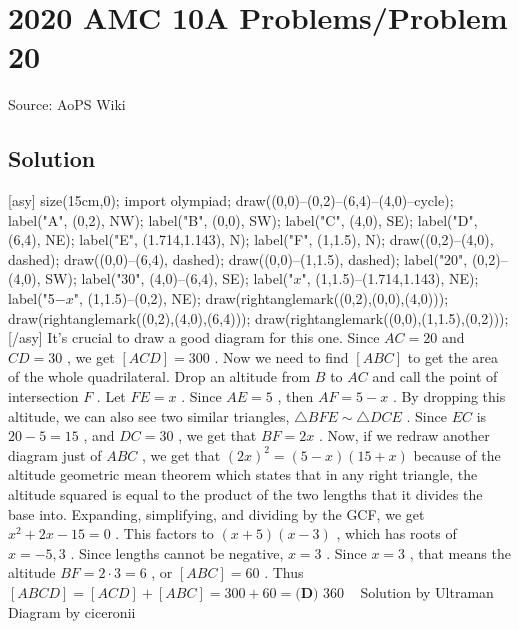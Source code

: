 \documentclass[12pt]{article}
\begin{document}
\section*{{2020 AMC 10A Problems/Problem 20}}
Source: AoPS Wiki

\subsection*{Solution}
[asy] size(15cm,0); import olympiad; draw((0,0)--(0,2)--(6,4)--(4,0)--cycle); label("A", (0,2), NW); label("B", (0,0), SW); label("C", (4,0), SE); label("D", (6,4), NE); label("E", (1.714,1.143), N); label("F", (1,1.5), N); draw((0,2)--(4,0), dashed); draw((0,0)--(6,4), dashed); draw((0,0)--(1,1.5), dashed); label("20", (0,2)--(4,0), SW); label("30", (4,0)--(6,4), SE); label("$x$", (1,1.5)--(1.714,1.143), NE); label("5$-$$x$", (1,1.5)--(0,2), NE); draw(rightanglemark((0,2),(0,0),(4,0))); draw(rightanglemark((0,2),(4,0),(6,4))); draw(rightanglemark((0,0),(1,1.5),(0,2))); [/asy] It's crucial to draw a good diagram for this one. Since $AC=20$ and $CD=30$ , we get $[ACD]=300$ . Now we need to find $[ABC]$ to get the area of the whole quadrilateral. Drop an altitude from $B$ to $AC$ and call the point of intersection $F$ . Let $FE=x$ . Since $AE=5$ , then $AF=5-x$ . By dropping this altitude, we can also see two similar triangles, $\triangle BFE \sim \triangle DCE$ . Since $EC$ is $20-5=15$ , and $DC=30$ , we get that $BF=2x$ . Now, if we redraw another diagram just of $ABC$ , we get that $(2x)^2=(5-x)(15+x)$ because of the altitude geometric mean theorem which states that in any right triangle, the altitude squared is equal to the product of the two lengths that it divides the base into. Expanding, simplifying, and dividing by the GCF, we get $x^2+2x-15=0$ . This factors to $(x+5)(x-3)$ , which has roots of $x=-5, 3$ . Since lengths cannot be negative, $x=3$ . Since $x=3$ , that means the altitude $BF=2\cdot3=6$ , or $[ABC]=60$ . Thus $[ABCD]=[ACD]+[ABC]=300+60=\boxed {\textbf{(D) }360}$ ~ Solution by Ultraman
~ Diagram by ciceronii
\end{document}
